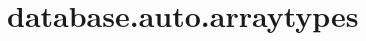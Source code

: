 \section{database.auto.arraytypes}
\label{configuration:DatabaseAutoArraytypes}
\AvailableInJavaOnly{\TODO}